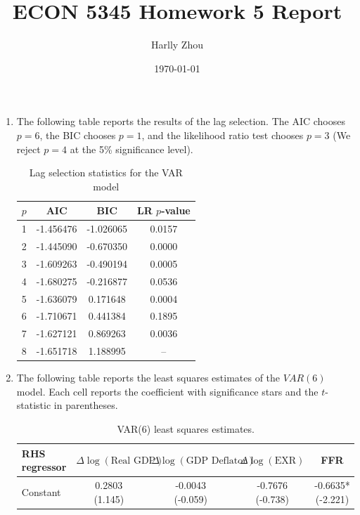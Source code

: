 \documentclass[12pt]{article}
\title{ECON 5345 Homework 5 Report}
\author{Harlly Zhou}
\date{\today}
\begin{document}
\maketitle

\begin{enumerate}[label=\arabic*.]
   \item The following table reports the results of the lag selection. The AIC chooses $p=6$, the BIC chooses $p=1$, and the likelihood ratio test chooses $p=3$ (We reject $p=4$ at the 5\% significance level).
   \begin{table}[!htbp]
    \centering
    \caption{Lag selection statistics for the VAR model}
    \begin{tabular}{cccc}
    \hline
    $p$ & AIC & BIC & LR $p$-value \\
    \hline
    1 & -1.456476 & -1.026065 & 0.0157 \\
    2 & -1.445090 & -0.670350 & 0.0000 \\
    3 & -1.609263 & -0.490194 & 0.0005 \\
    4 & -1.680275 & -0.216877 & 0.0536 \\
    5 & -1.636079 & 0.171648  & 0.0004 \\
    6 & -1.710671 & 0.441384  & 0.1895 \\
    7 & -1.627121 & 0.869263  & 0.0036 \\
    8 & -1.651718 & 1.188995  & -- \\
    \hline
    \end{tabular}
    \label{tab:var_lag_selection}
    \end{table}

    \newpage
    \item The following table reports the least squares estimates of the $VAR(6)$ model. Each cell reports the coefficient with significance stars and the $t$-statistic in parentheses.
    \begin{table}[htbp]
        \centering
        \caption{VAR(6) least squares estimates. }
        \label{tab:hw5_q2_var_ols}
        \scriptsize
        \begin{tabular}{lcccc}
        \hline
        RHS regressor & $\Delta\log(\text{Real GDP})$ & $\Delta\log(\text{GDP Deflator})$ & $\Delta\log(\text{EXR})$ & FFR \\
        \hline
        
        Constant 
        & \makecell{0.2803\\(1.145)}
        & \makecell{-0.0043\\(-0.059)}
        & \makecell{-0.7676\\(-0.738)}
        & \makecell{-0.6635*\\(-2.221)} \\
        

\end{tabular}
\end{table}
\end{enumerate}
\end{document}
